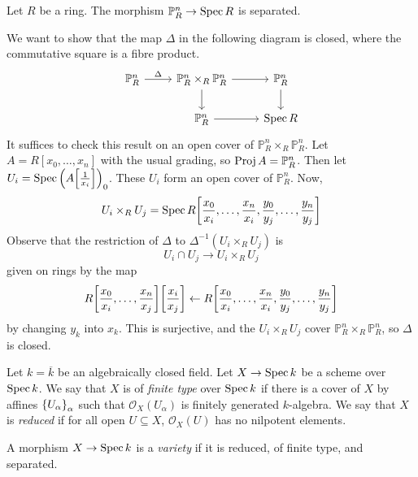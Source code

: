 \begin{proposition}
    Let \( R \) be a ring.
    The morphism \( \mathbb P^n_R \to \operatorname{Spec} R \) is separated.
\end{proposition}
\begin{proposition}
    We want to show that the map \( \Delta \) in the following diagram is closed, where the commutative square is a fibre product.
\[\begin{tikzcd}
	{\mathbb P^n_R} & {\mathbb P^n_R \times_R \mathbb P^n_R} & {\mathbb P^n_R} \\
	& {\mathbb P^n_R} & {\Spec R}
	\arrow["\Delta", from=1-1, to=1-2]
	\arrow[from=1-2, to=2-2]
	\arrow[from=1-2, to=1-3]
	\arrow[from=1-3, to=2-3]
	\arrow[from=2-2, to=2-3]
\end{tikzcd}\]
    It suffices to check this result on an open cover of \( \mathbb P^n_R \times_R \mathbb P^n_R \).
    Let \( A = R[x_0, \dots, x_n] \) with the usual grading, so \( \operatorname{Proj} A = \mathbb P^n_R \).
    Then let \( U_i = \operatorname{Spec} \qty(A\qty[\frac{1}{x_i}])_0 \).
    These \( U_i \) form an open cover of \( \mathbb P^n_R \).
    Now,
    \[ U_i \times_R U_j = \operatorname{Spec} R\qty[\frac{x_0}{x_i}, \dots, \frac{x_n}{x_i}, \frac{y_0}{y_j}, \dots, \frac{y_n}{y_j}] \]
    Observe that the restriction of \( \Delta \) to \( \Delta^{-1}(U_i \times_R U_j) \) is
    \[ U_i \cap U_j \to U_i \times_R U_j \]
    given on rings by the map
    \[ R\qty[\frac{x_0}{x_i}, \dots, \frac{x_n}{x_j}]\qty[\frac{x_i}{x_j}] \leftarrow R\qty[\frac{x_0}{x_i}, \dots, \frac{x_n}{x_i}, \frac{y_0}{y_j}, \dots, \frac{y_n}{y_j}] \]
    by changing \( y_k \) into \( x_k \).
    This is surjective, and the \( U_i \times_R U_j \) cover \( \mathbb P^n_R \times_R \mathbb P^n_R \), so \( \Delta \) is closed.
\end{proposition}
\begin{definition}
    Let \( k = \overline k \) be an algebraically closed field.
    Let \( X \to \operatorname{Spec} k \) be a scheme over \( \operatorname{Spec} k \).
    We say that \( X \) is of \emph{finite type} over \( \operatorname{Spec} k \) if there is a cover of \( X \) by affines \( \qty{U_\alpha}_\alpha \) such that \( \mathcal O_X(U_\alpha) \) is finitely generated \( k \)-algebra.
    We say that \( X \) is \emph{reduced} if for all open \( U \subseteq X \), \( \mathcal O_X(U) \) has no nilpotent elements.
\end{definition}
\begin{definition}
    A morphism \( X \to \operatorname{Spec} k \) is a \emph{variety} if it is reduced, of finite type, and separated.
\end{definition}


